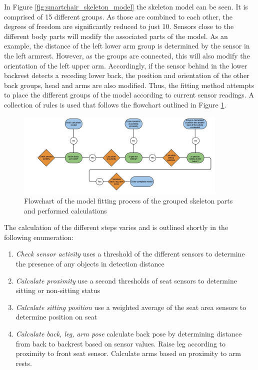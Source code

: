 In Figure \ref{fig:smartchair_skeleton_model} the skeleton model can be seen. It is comprised of 15 different groups. As those are combined to each other, the degrees of freedom are significantly reduced to just 10. Sensors close to the different body parts will modify the associated parts of the model. As an example, the distance of the left lower arm group is determined by the sensor in the left armrest. However, as the groups are connected, this will also modify the orientation of the left upper arm. Accordingly, if the sensor behind in the lower backrest detects a receding lower back, the position and orientation of the other back groups, head and arms are also modified. Thus, the fitting method attempts to place the different groups of the model according to current sensor readings. A collection of rules is used that follows the flowchart outlined in Figure \ref{fig:capchair_flow}.

\begin{figure}[ht]
\centering
\includegraphics[width=0.9\textwidth]{images/capchair_flow}
\caption{Flowchart of the model fitting process of the grouped skeleton parts and performed calculations}
\label{fig:capchair_flow}
\end{figure}


The calculation of the different steps varies and is outlined shortly in the following enumeration:
\begin{enumerate}
\item \emph{Check sensor activity} uses a threshold of the different sensors to determine the presence of any objects in detection distance
\item \emph{Calculate proximity} use a second thresholds of seat sensors to determine sitting or non-sitting status
\item \emph{Calculate sitting position} use a weighted average of the seat area sensors to determine position on seat
\item \emph{Calculate back, leg, arm pose} calculate back pose by determining distance from back to backrest based on sensor values. Raise leg according to proximity to front seat sensor. Calculate arms based on proximity to arm rests.
\end{enumerate}

